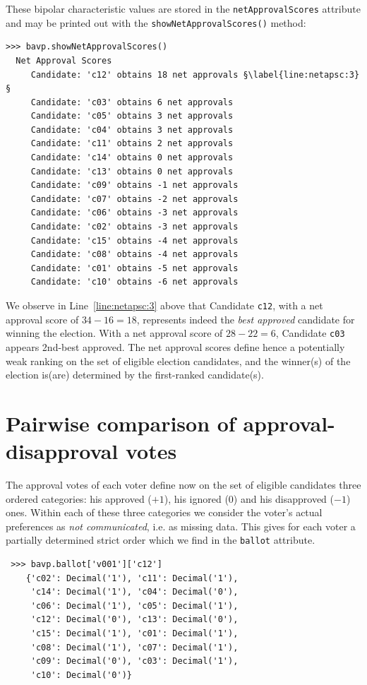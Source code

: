 These bipolar characteristic values are stored in the \texttt{netApprovalScores} attribute and may be printed out with the \texttt{showNetApprovalScores()} method:
\begin{lstlisting}
>>> bavp.showNetApprovalScores()
  Net Approval Scores
     Candidate: 'c12' obtains 18 net approvals §\label{line:netapsc:3}§
     Candidate: 'c03' obtains 6 net approvals
     Candidate: 'c05' obtains 3 net approvals
     Candidate: 'c04' obtains 3 net approvals
     Candidate: 'c11' obtains 2 net approvals
     Candidate: 'c14' obtains 0 net approvals
     Candidate: 'c13' obtains 0 net approvals
     Candidate: 'c09' obtains -1 net approvals
     Candidate: 'c07' obtains -2 net approvals
     Candidate: 'c06' obtains -3 net approvals
     Candidate: 'c02' obtains -3 net approvals
     Candidate: 'c15' obtains -4 net approvals
     Candidate: 'c08' obtains -4 net approvals
     Candidate: 'c01' obtains -5 net approvals
     Candidate: 'c10' obtains -6 net approvals
\end{lstlisting}

We observe in Line~\ref{line:netapsc:3} above that Candidate \texttt{c12}, with a net approval score of $34 - 16 = 18$, represents indeed the \emph{best approved} candidate for winning the election. With a net approval score of $28-22 = 6$, Candidate \texttt{c03} appears 2nd-best approved. The net approval scores define hence a potentially weak ranking on the set of eligible election candidates, and the winner(s) of the election is(are) determined by the first-ranked candidate(s).

\section{Pairwise comparison of approval-disapproval votes}
\label{sec:20.3}

The approval votes of each voter define now on the set of eligible candidates three ordered categories: his approved ($+1$), his ignored ($0$) and his disapproved ($-1$) ones. Within each of these three categories we consider the voter's actual preferences as \emph{not communicated}, i.e. as missing data. This gives for each voter a partially determined strict order which we find in the \texttt{ballot} attribute.
\begin{lstlisting}
 >>> bavp.ballot['v001']['c12']
    {'c02': Decimal('1'), 'c11': Decimal('1'),
     'c14': Decimal('1'), 'c04': Decimal('0'),
     'c06': Decimal('1'), 'c05': Decimal('1'),
     'c12': Decimal('0'), 'c13': Decimal('0'),
     'c15': Decimal('1'), 'c01': Decimal('1'),
     'c08': Decimal('1'), 'c07': Decimal('1'),
     'c09': Decimal('0'), 'c03': Decimal('1'),
     'c10': Decimal('0')}
\end{lstlisting}

